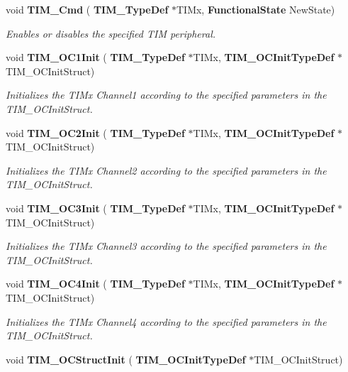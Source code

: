 \begin{DoxyCompactItemize}
void \textbf{ T\+I\+M\+\_\+\+Cmd} (\textbf{ T\+I\+M\+\_\+\+Type\+Def} $\ast$T\+I\+Mx, \textbf{ Functional\+State} New\+State)
\begin{DoxyCompactList}\small\item\em Enables or disables the specified T\+IM peripheral. \end{DoxyCompactList}\item 
void \textbf{ T\+I\+M\+\_\+\+O\+C1\+Init} (\textbf{ T\+I\+M\+\_\+\+Type\+Def} $\ast$T\+I\+Mx, \textbf{ T\+I\+M\+\_\+\+O\+C\+Init\+Type\+Def} $\ast$T\+I\+M\+\_\+\+O\+C\+Init\+Struct)
\begin{DoxyCompactList}\small\item\em Initializes the T\+I\+Mx Channel1 according to the specified parameters in the T\+I\+M\+\_\+\+O\+C\+Init\+Struct. \end{DoxyCompactList}\item 
void \textbf{ T\+I\+M\+\_\+\+O\+C2\+Init} (\textbf{ T\+I\+M\+\_\+\+Type\+Def} $\ast$T\+I\+Mx, \textbf{ T\+I\+M\+\_\+\+O\+C\+Init\+Type\+Def} $\ast$T\+I\+M\+\_\+\+O\+C\+Init\+Struct)
\begin{DoxyCompactList}\small\item\em Initializes the T\+I\+Mx Channel2 according to the specified parameters in the T\+I\+M\+\_\+\+O\+C\+Init\+Struct. \end{DoxyCompactList}\item 
void \textbf{ T\+I\+M\+\_\+\+O\+C3\+Init} (\textbf{ T\+I\+M\+\_\+\+Type\+Def} $\ast$T\+I\+Mx, \textbf{ T\+I\+M\+\_\+\+O\+C\+Init\+Type\+Def} $\ast$T\+I\+M\+\_\+\+O\+C\+Init\+Struct)
\begin{DoxyCompactList}\small\item\em Initializes the T\+I\+Mx Channel3 according to the specified parameters in the T\+I\+M\+\_\+\+O\+C\+Init\+Struct. \end{DoxyCompactList}\item 
void \textbf{ T\+I\+M\+\_\+\+O\+C4\+Init} (\textbf{ T\+I\+M\+\_\+\+Type\+Def} $\ast$T\+I\+Mx, \textbf{ T\+I\+M\+\_\+\+O\+C\+Init\+Type\+Def} $\ast$T\+I\+M\+\_\+\+O\+C\+Init\+Struct)
\begin{DoxyCompactList}\small\item\em Initializes the T\+I\+Mx Channel4 according to the specified parameters in the T\+I\+M\+\_\+\+O\+C\+Init\+Struct. \end{DoxyCompactList}\item 
void \textbf{ T\+I\+M\+\_\+\+O\+C\+Struct\+Init} (\textbf{ T\+I\+M\+\_\+\+O\+C\+Init\+Type\+Def} $\ast$T\+I\+M\+\_\+\+O\+C\+Init\+Struct)

\end{DoxyCompactItemize}
